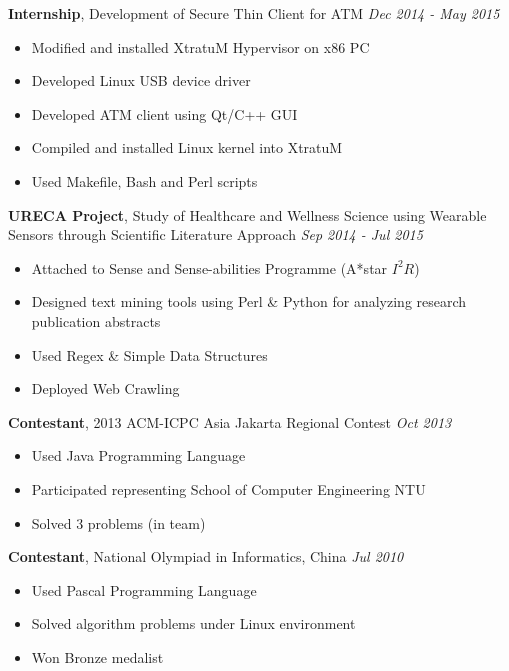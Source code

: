 \documentclass[a4paper, 12pt]{article}
\newenvironment{changemargin}[2]{%
  \begin{list}{}{%
      \setlength{\topsep}{0pt}%
      \setlength{\leftmargin}{#1}%
      \setlength{\rightmargin}{#2}%
      \setlength{\listparindent}{\parindent}%
      \setlength{\itemindent}{\parindent}%
      \setlength{\parsep}{\parskip}%
    }%
  \item[]}{\end{list}
}
\newenvironment{body}
{
\vspace*{-16pt}
\begin{changemargin}{-0.25in}{-0.5in}
}	
{
\end{changemargin}
}
\begin{document}
\begin{body}
  \vspace{14pt}

  \textbf{Internship}, {Development of Secure Thin Client for ATM} \hfill \emph{Dec 2014 - May 2015}\\
  \vspace*{-4pt}
  \begin{itemize} \itemsep -0pt  \small
  \item Modified and installed XtratuM Hypervisor on x86 PC
  \item Developed Linux USB device driver
  \item Developed ATM client using Qt/C++ GUI
  \item Compiled and installed Linux kernel into XtratuM
  \item Used Makefile, Bash and Perl scripts
  \end{itemize}

  \textbf{URECA Project}, {Study of Healthcare and Wellness Science using Wearable Sensors through Scientific Literature Approach} \hfill \emph{Sep 2014 - Jul 2015}\\
  \vspace*{-4pt}
  \begin{itemize} \itemsep -0pt  \small
  \item Attached to Sense and Sense-abilities Programme (A*star $I^{2}R$)
  \item Designed text mining tools using Perl \& Python for analyzing research publication abstracts
  \item Used Regex \& Simple Data Structures
  \item Deployed Web Crawling
  \end{itemize}

  \textbf{Contestant}, {2013 ACM-ICPC Asia Jakarta Regional Contest} \hfill \emph{Oct 2013}\\
  \vspace*{-4pt}
  \begin{itemize} \itemsep -0pt  \small
  \item Used Java Programming Language
  \item Participated representing School of Computer Engineering NTU
  \item Solved 3 problems (in team)
  \end{itemize}
  
  \textbf {Contestant}, {National Olympiad in Informatics, China} \hfill \emph{Jul 2010}\\
  \vspace*{-4pt}
  \begin{itemize} \itemsep -0pt \small
  \item Used Pascal Programming Language
  \item Solved algorithm problems under Linux environment
  \item Won Bronze medalist
  \end{itemize}


\end{body}
\end{document}
